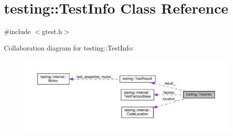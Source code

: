 \hypertarget{classtesting_1_1TestInfo}{}\section{testing\+:\+:Test\+Info Class Reference}
\label{classtesting_1_1TestInfo}


{\ttfamily \#include $<$gtest.\+h$>$}



Collaboration diagram for testing\+:\+:Test\+Info\+:\nopagebreak
\begin{figure}[H]
\begin{center}
\leavevmode
\includegraphics[width=350pt]{classtesting_1_1TestInfo__coll__graph}
\end{center}
\end{figure}
